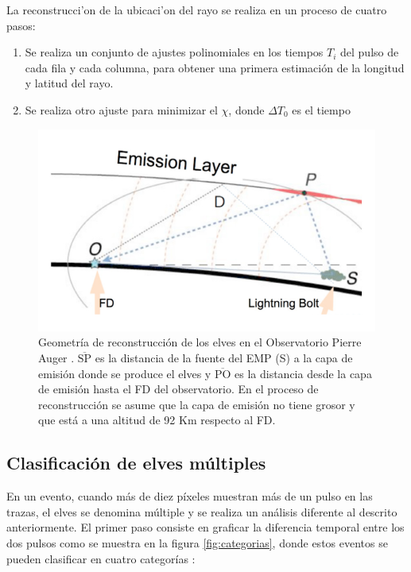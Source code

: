 \documentclass[12pt,oneside,openany,letter]{book}
\begin{document}
La reconstrucci'on de la ubicaci'on del rayo se realiza en un proceso de cuatro pasos:
\begin{enumerate}
    \item Se realiza un conjunto de ajustes polinomiales en los tiempos $T_i$ del pulso de cada fila y cada columna, para obtener una primera estimaci\'on de la longitud y latitud del rayo. 
    \item Se realiza otro ajuste para minimizar el $\chi$, donde $\Delta T_0$ es el tiempo 
\end{enumerate}
\begin{figure}
    \centering
    \includegraphics[scale=0.4]{figures/emission_layer.png}
    \caption[Geometr\'ia de reconstrucci\'on de los elves en el Observatorio Pierre Auger]{Geometr\'ia de reconstrucci\'on de los elves en el Observatorio Pierre Auger \cite{Mussa2019}. $\overline{\text{SP}}$ es la distancia de la fuente del EMP (S) a la capa de emisi\'on donde se produce el elves y $\overline{\text{PO}}$ es la distancia desde la capa de emisi\'on hasta el FD del observatorio. En el proceso de reconstrucci\'on se asume que la capa de emisi\'on no tiene grosor y que est\'a a una altitud de 92 Km respecto al FD.}
    \label{fig:my_label}
\end{figure}

\subsection{Clasificación de elves múltiples}
En un evento, cuando m\'as de diez p\'ixeles muestran m\'as de un pulso en las trazas, el elves se denomina m\'ultiple y se realiza un an\'alisis diferente al descrito anteriormente. El primer paso consiste en graficar la diferencia temporal entre los dos pulsos como se muestra en la figura \ref{fig:categorias}, donde estos eventos se pueden clasificar en cuatro categor\'ias \cite{Mussa2019}:
\end{document}

